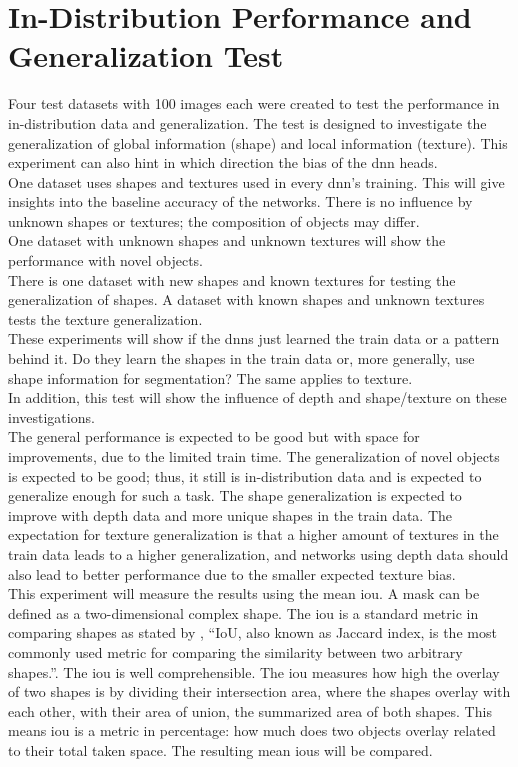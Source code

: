 	\clearpage
	
	\section{In-Distribution Performance and Generalization Test}
	\label{sec:in-distribution-performance-generalization}
		Four test datasets with 100 images each were created to test the performance in in-distribution data and generalization. The test is designed to investigate the generalization of global information (shape) and local information (texture). This experiment can also hint in which direction the bias of the \ac{dnn} heads.\\
		One dataset uses shapes and textures used in every \ac{dnn}'s training. This will give insights into the baseline accuracy of the networks. There is no influence by unknown shapes or textures; the composition of objects may differ.\\
		One dataset with unknown shapes and unknown textures will show the performance with novel objects.\\
		There is one dataset with new shapes and known textures for testing the generalization of shapes. A dataset with known shapes and unknown textures tests the texture generalization.\\
		These experiments will show if the \ac{dnn}s just learned the train data or a pattern behind it. Do they learn the shapes in the train data or, more generally, use shape information for segmentation? The same applies to texture.\\
		In addition, this test will show the influence of depth and shape/texture on these investigations.\\
		The general performance is expected to be good but with space for improvements, due to the limited train time. The generalization of novel objects is expected to be good; thus, it still is in-distribution data and is expected to generalize enough for such a task. The shape generalization is expected to improve with depth data and more unique shapes in the train data. The expectation for texture generalization is that a higher amount of textures in the train data leads to a higher generalization, and networks using depth data should also lead to better performance due to the smaller expected texture bias.\\
		This experiment will measure the results using the mean \acl{iou}. A mask can be defined as a two-dimensional complex shape. The \ac{iou} is a standard metric in comparing shapes as stated by \textcite{Rezatofighi2019}, \enquote{IoU, also known as Jaccard index, is the most commonly used metric for comparing the similarity between two arbitrary shapes.}. The \ac{iou} is well comprehensible. The \ac{iou} measures how high the overlay of two shapes is by dividing their intersection area, where the shapes overlay with each other, with their area of union, the summarized area of both shapes. This means \ac{iou} is a metric in percentage: how much does two objects overlay related to their total taken space. The resulting mean \ac{iou}s will be compared.\\
